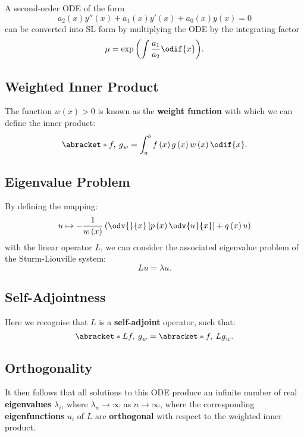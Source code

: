 \documentclass{article}
\begin{document}
A second-order ODE of the form
\begin{equation*}
    a_2\left( x \right) y''\left( x \right) + a_1\left( x \right) y'\left( x \right) + a_0\left( x \right) y\left( x \right) = 0
\end{equation*}
can be converted into SL form by multiplying the ODE by the integrating factor
\begin{equation*}
    \mu = \exp{\left( \int \frac{a_1}{a_2} \odif{x} \right)}.
\end{equation*}
\subsection{Weighted Inner Product}
The function \(w\left( x \right) > 0\) is known as the \textbf{weight function} with which we can define the inner product:
\begin{equation*}
    \abracket*{f,\: g}_{w} = \int_a^b f\left( x \right) g\left( x \right) w\left( x \right) \odif{x}.
\end{equation*}
\subsection{Eigenvalue Problem}
By defining the mapping:
\begin{equation*}
    u \mapsto - \frac{1}{w\left( x \right)} \left( \odv{}{x} \left[ p\left( x \right) \odv{u}{x} \right] + q\left( x \right) u \right)
\end{equation*}
with the linear operator \(L\), we can consider the associated eigenvalue problem of
the Sturm-Liouville system:
\begin{equation*}
    L u = \lambda u.
\end{equation*}
\subsection{Self-Adjointness}
Here we recognise that \(L\) is a \textbf{self-adjoint} operator, such that:
\begin{equation*}
    \abracket*{Lf,\: g}_{w} = \abracket*{f,\: Lg}_{w}.
\end{equation*}
\subsection{Orthogonality}
It then follows that all solutions to this ODE produce an infinite number of real \textbf{eigenvalues} \(\lambda_i\),
where \(\lambda_n \to \infty\) as \(n \to \infty\), where the corresponding \textbf{eigenfunctions} \(u_i\) of \(L\)
are \textbf{orthogonal} with respect to the weighted inner product.
\end{document}
